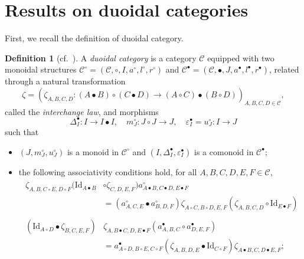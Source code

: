 \documentclass[nosumlimits,twoside]{amsart}
\theoremstyle{definition}
\newtheorem{definition}[definition]{\sc Definition}
\theoremstyle{remark}
\newcommand{\id}{\mathrm{Id}}
\newcommand{\Cc}{\mathcal{C}}
\begin{document}
\section{Results on duoidal categories}
\label{sec:duoidal}



First, we recall the definition of duoidal category.

\begin{definition}[{cf.\ \cite[Definition 6.1]{Aguiar}}]
    A \emph{duoidal category} is a category $\Cc$ equipped with two monoidal structures $\Cc^\circ= (\Cc, \circ, I, a^\circ, l^\circ, r^\circ )$ and $\Cc^\bullet = (\Cc, \bullet, J, a^\bullet, l^\bullet, r^\bullet )$,  related through a natural transformation
\begin{equation}
\label{def:zetaduoidal}
\zeta=(\zeta_{A,B,C,D}: (A\bullet B)\circ (C\bullet D)\to (A\circ C)\bullet (B\circ D))_{A,B,C,D\in\Cc},
\end{equation}
called the \emph{interchange law}, and morphisms
\begin{equation}\label{def:deltamepsilonduoidal}
\Delta^{\bullet}_I:I\to I\bullet I, \quad m^{\circ}_J: J\circ J\to J, \quad \varepsilon^{\bullet}_I=u^{\circ}_{J}:I\to J
\end{equation}
such that
\begin{itemize}
    \item[$i)$] $(J, m^\circ_J, u^\circ_J)$ is a monoid in $\Cc^\circ$ and $(I, \Delta^\bullet_I, \varepsilon^\bullet_I)$ is a comonoid in $\Cc^\bullet$;
    \item[$ii)$] the following associativity conditions hold, for all $A,B,C,D,E,F\in\Cc$,
    \begin{gather}\label{eq:assoc1}
    \begin{split}
\zeta_{A,B, C\circ E, D\circ F}(\id_{A\bullet B}&\circ\zeta_{C,D,E,F})a^\circ_{A\bullet B, C\bullet D, E\bullet F}\\&=(a^\circ_{A,C,E}\bullet a^\circ_{B,D,F})\zeta_{A\circ C, B\circ D,E,F}(\zeta_{A,B,C,D}\circ\id_{E\bullet F})
 \end{split} \\\label{eq:assoc2}
    \begin{split}
(\id_{A\circ D}\bullet \zeta_{B,C,E,F})&\zeta_{A,B\bullet C, D, E\bullet F}(a^\bullet_{A,B,C}\circ a^\bullet_{D,E,F})\\&=a^\bullet_{A\circ D, B\circ E, C\circ F}(\zeta_{A,B,D, E}\bullet \id_{C\circ F})\zeta_{A\bullet B, C, D\bullet E, F};
    \end{split}

\end{gather}
\end{itemize}
\end{definition}
\end{document}
